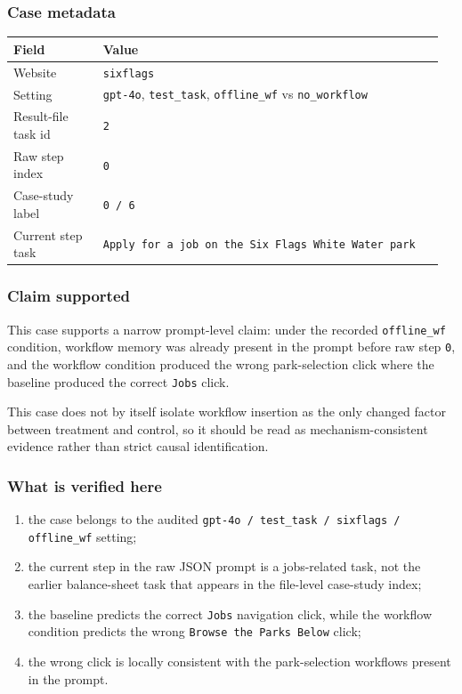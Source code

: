 \subsubsection{Case metadata}

{\def\LTcaptype{} %
\begin{longtable}[]{@{}>{\raggedright\arraybackslash}p{0.20\linewidth}>{\raggedright\arraybackslash}p{0.76\linewidth}@{}}
\toprule\noalign{}
Field & Value \\
\midrule\noalign{}
\endhead
\bottomrule\noalign{}
\endlastfoot
Website & \texttt{sixflags} \\
Setting & \texttt{gpt-4o}, \texttt{test\_task}, \texttt{offline\_wf} vs
\texttt{no\_workflow} \\
Result-file task id & \texttt{2} \\
Raw step index & \texttt{0} \\
Case-study label & \texttt{0\ /\ 6} \\
Current step task &
\texttt{Apply\ for\ a\ job\ on\ the\ Six\ Flags\ White\ Water\ park} \\
\end{longtable}
}

\subsubsection{Claim supported}

This case supports a narrow prompt-level claim: under the recorded
\texttt{offline\_wf} condition, workflow memory was already present in
the prompt before raw step \texttt{0}, and the workflow condition
produced the wrong park-selection click where the baseline produced the
correct \texttt{Jobs} click.

This case does not by itself isolate workflow insertion as the only
changed factor between treatment and control, so it should be read as
mechanism-consistent evidence rather than strict causal identification.

\subsubsection{What is verified here}

\begin{enumerate}
\def\labelenumi{\arabic{enumi}.}
\tightlist
\item the case belongs to the audited \texttt{gpt-4o / test\_task / sixflags / offline\_wf} setting;
\item the current step in the raw JSON prompt is a jobs-related task, not the earlier balance-sheet task that appears in the file-level case-study index;
\item the baseline predicts the correct \texttt{Jobs} navigation click, while the workflow condition predicts the wrong \texttt{Browse the Parks Below} click;
\item the wrong click is locally consistent with the park-selection workflows present in the prompt.
\end{enumerate}

